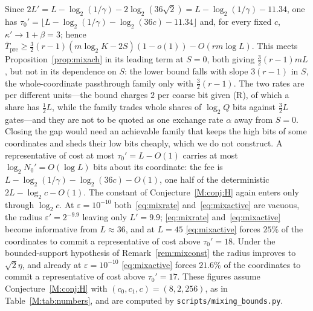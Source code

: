 \documentclass[aps,prx,twocolumn,superscriptaddress,nofootinbib,longbibliography]{revtex4-2}
\theoremstyle{plain}
\theoremstyle{definition}
\theoremstyle{remark}
\newcommand{\Tpre}{T_{\mathrm{pre}}}
\begin{document}
Since $2L'=L-\log_2(1/\gamma)-2\log_2(36\sqrt2)=L-\log_2(1/\gamma)-11.34$, one has $\tau_0'=\lfloor L-\log_2(1/\gamma)-\log_2(36c)-11.34\rfloor$ and, for every fixed $c$, $\kappa'\to1+\beta=3$; hence $\bar\Tpre\ge\tfrac32(r-1)(m\log_2K-2S)(1-o(1))-O(rm\log L)$. This meets Proposition~\ref{prop:mixach} in its leading term at $S=0$, both giving $\tfrac32(r-1)mL$, but not in its dependence on $S$: the lower bound falls with slope $3(r-1)$ in $S$, the whole-coordinate passthrough family only with $\tfrac32(r-1)$. The two rates are per different units---the bound charges $2$ per coarse bit given (R), of which a share has $\tfrac12L$, while the family trades whole shares of $\log_2Q$ bits against $\tfrac32L$ gates---and they are not to be quoted as one exchange rate $\alpha$ away from $S=0$. Closing the gap would need an achievable family that keeps the high bits of some coordinates and sheds their low bits cheaply, which we do not construct. A representative of cost at most $\tau_0'=L-O(1)$ carries at most $\log_2N_0'=O(\log L)$ bits about its coordinate: the fee is $L-\log_2(1/\gamma)-\log_2(36c)-O(1)$, one half of the deterministic $2L-\log_2c-O(1)$. The constant of Conjecture~\ref{M:conj:H} again enters only through $\log_2c$. At $\varepsilon=10^{-10}$ both~\eqref{eq:mixrate} and~\eqref{eq:mixactive} are vacuous, the radius $\varepsilon'=2^{-9.9}$ leaving only $L'=9.9$; \eqref{eq:mixrate} and~\eqref{eq:mixactive} become informative from $L\approx36$, and at $L=45$ \eqref{eq:mixactive} forces $25\%$ of the coordinates to commit a representative of cost above $\tau_0'=18$. Under the bounded-support hypothesis of Remark~\ref{rem:mixconst} the radius improves to $\sqrt2\eta$, and already at $\varepsilon=10^{-10}$ \eqref{eq:mixactive} forces $21.6\%$ of the coordinates to commit a representative of cost above $\tau_0'=17$. These figures assume Conjecture~\ref{M:conj:H} with $(c_0,c_1,c)=(8,2,256)$, as in Table~\ref{M:tab:numbers}, and are computed by \texttt{scripts/mixing\_bounds.py}.
\end{document}
